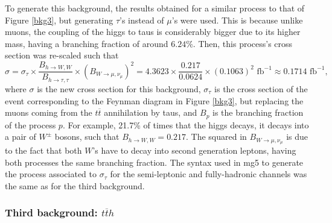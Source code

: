 To generate this background, the results obtained for a similar process to that of Figure \ref{bkg3}, but generating $\tau$'s instead of $\mu$'s were used. This is because unlike muons, the coupling of the higgs to taus is considerably bigger due to its higher mass, having a branching fraction of around $6.24\%$. Then, this process's cross section was re-scaled such that
\begin{equation*}
    \sigma = \sigma_{\tau} \times \dfrac{B_{h \rightarrow W, W}}{B_{h \rightarrow \tau, \tau}} \times (B_{W \rightarrow \mu, \nu_{\mu}})^2 = 4.3623 \times \dfrac{0.217}{0.0624} \times (0.1063)^2 \textrm{ fb}^{-1} \approx 0.1714 \textrm{ fb}^{-1},
\end{equation*}
where $\sigma$ is the new cross section for this background, $\sigma_{\tau}$ is the cross section of the event corresponding to the Feynman diagram in Figure \ref{bkg3}, but replacing the muons coming from the $t\overline t$ annihilation by taus, and $B_p$ is the branching fraction of the process $p$. For example, 21.7\% of times that the higgs decays, it decays into a pair of $W^{\pm}$ bosons, such that $B_{h \rightarrow W, W} = 0.217$. The squared in $B_{W \rightarrow \mu, \nu_{\mu}}$ is due to the fact that both $W$'s have to decay into second generation leptons, having both processes the same branching fraction. The syntax used in mg5 to generate the process associated to $\sigma_{\tau}$ for the semi-leptonic and fully-hadronic channels was the same as for the third background.

\subsubsection{Third background: $t\overline th$} \label{ssec:thirdbkg}


